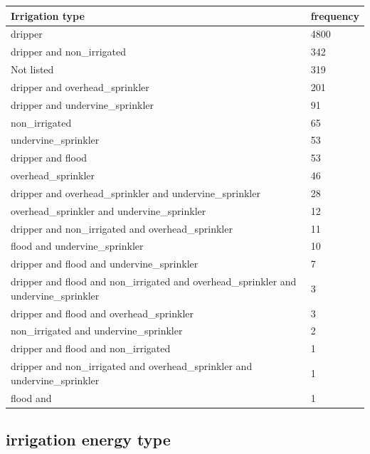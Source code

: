 \documentclass[review,12pt,authoryear]{elsarticle}
\begin{document}
\begin{linenumbers}
\begin{table}[]
  \begin{tabular}{@{}ll@{}}
  \toprule
  Irrigation type & frequency \\ \midrule
  dripper & 4800 \\
  dripper and non_irrigated & 342 \\
  Not listed & 319 \\
  dripper and overhead_sprinkler & 201 \\
  dripper and undervine_sprinkler & 91 \\
  non_irrigated & 65 \\
  undervine_sprinkler & 53 \\
  dripper and flood & 53 \\
  overhead_sprinkler & 46 \\
  dripper and overhead_sprinkler and undervine_sprinkler & 28 \\
  overhead_sprinkler and undervine_sprinkler & 12 \\
  dripper and non_irrigated and overhead_sprinkler & 11 \\
  flood and undervine_sprinkler & 10 \\
  dripper and flood and undervine_sprinkler & 7 \\
  dripper and flood and non_irrigated and overhead_sprinkler and undervine_sprinkler & 3 \\
  dripper and flood and overhead_sprinkler & 3 \\
  non_irrigated and undervine_sprinkler & 2 \\
  dripper and flood and non_irrigated & 1 \\
  dripper and non_irrigated and overhead_sprinkler and undervine_sprinkler & 1 \\
  flood and & 1 \\ \bottomrule
  \end{tabular}
  \end{table}

  \subsection{irrigation energy type}


\end{linenumbers}
\end{document}
